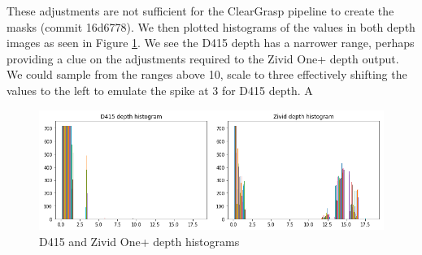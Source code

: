 These adjustments are not sufficient for the ClearGrasp pipeline to create the masks (commit 16d6778). We then plotted histograms of the values in both depth images as seen in Figure \ref{fig:Depth-Histograms}. We see the D415 depth has a narrower range, perhaps providing a clue on the adjustments required to the Zivid One+ depth output. We could sample from the ranges above 10, scale to three effectively shifting the values to the left to emulate the spike at 3 for D415 depth. A

\begin{figure}[h!]
\centering
\includegraphics[width=\textwidth]{Figures/Depth-Histograms.png}
\caption{D415 and Zivid One+ depth histograms}
\label{fig:Depth-Histograms}
\end{figure}




